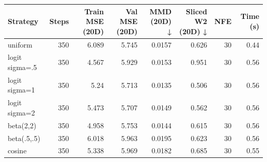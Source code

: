 \begin{tabular}{lrrrrrrr}
\toprule
Strategy & Steps & Train MSE (20D) & Val MSE (20D) & MMD (20D) ↓ & Sliced W2 (20D) ↓ & NFE & Time (s) \\
\midrule
uniform & 350 & 6.089 & 5.745 & 0.0157 & 0.626 & 30 & 0.44 \\
logit sigma=.5 & 350 & 4.567 & 5.929 & 0.0153 & 0.951 & 30 & 0.56 \\
logit sigma=1 & 350 & 5.24 & 5.713 & 0.0135 & 0.506 & 30 & 0.56 \\
logit sigma=2 & 350 & 5.473 & 5.707 & 0.0149 & 0.562 & 30 & 0.56 \\
beta(2,2) & 350 & 4.958 & 5.753 & 0.0144 & 0.615 & 30 & 0.56 \\
beta(.5,.5) & 350 & 6.018 & 5.963 & 0.0195 & 0.623 & 30 & 0.56 \\
cosine & 350 & 5.338 & 5.969 & 0.0182 & 0.685 & 30 & 0.55 \\
\bottomrule
\end{tabular}
